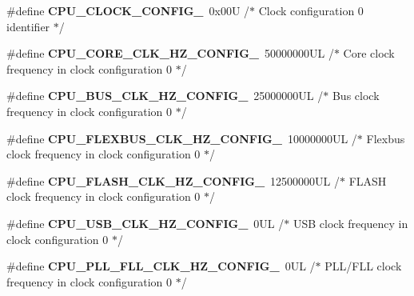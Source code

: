 \begin{DoxyCompactItemize}
\item 
\hypertarget{group___cpu__module_ga4d7ade6a1c335a7e5233938aa9197157}{}\#define {\bfseries C\+P\+U\+\_\+\+C\+L\+O\+C\+K\+\_\+\+C\+O\+N\+F\+I\+G\+\_}~0x00\+U /$\ast$ Clock configuration 0 identifier $\ast$/\label{group___cpu__module_ga4d7ade6a1c335a7e5233938aa9197157}

\item 
\hypertarget{group___cpu__module_ga6fe0b841d40421ee48af4a4e01e48ddf}{}\#define {\bfseries C\+P\+U\+\_\+\+C\+O\+R\+E\+\_\+\+C\+L\+K\+\_\+\+H\+Z\+\_\+\+C\+O\+N\+F\+I\+G\+\_}~50000000\+U\+L /$\ast$ Core clock frequency in clock configuration 0 $\ast$/\label{group___cpu__module_ga6fe0b841d40421ee48af4a4e01e48ddf}

\item 
\hypertarget{group___cpu__module_gaf060a047649b9537eb77354ab7917a8b}{}\#define {\bfseries C\+P\+U\+\_\+\+B\+U\+S\+\_\+\+C\+L\+K\+\_\+\+H\+Z\+\_\+\+C\+O\+N\+F\+I\+G\+\_}~25000000\+U\+L /$\ast$ Bus clock frequency in clock configuration 0 $\ast$/\label{group___cpu__module_gaf060a047649b9537eb77354ab7917a8b}

\item 
\hypertarget{group___cpu__module_ga706c0d4dd14c93181b7a99badddc9a51}{}\#define {\bfseries C\+P\+U\+\_\+\+F\+L\+E\+X\+B\+U\+S\+\_\+\+C\+L\+K\+\_\+\+H\+Z\+\_\+\+C\+O\+N\+F\+I\+G\+\_}~10000000\+U\+L /$\ast$ Flexbus clock frequency in clock configuration 0 $\ast$/\label{group___cpu__module_ga706c0d4dd14c93181b7a99badddc9a51}

\item 
\hypertarget{group___cpu__module_ga09c9820f38d931a0400b832d2582c6f7}{}\#define {\bfseries C\+P\+U\+\_\+\+F\+L\+A\+S\+H\+\_\+\+C\+L\+K\+\_\+\+H\+Z\+\_\+\+C\+O\+N\+F\+I\+G\+\_}~12500000\+U\+L /$\ast$ F\+L\+A\+S\+H clock frequency in clock configuration 0 $\ast$/\label{group___cpu__module_ga09c9820f38d931a0400b832d2582c6f7}

\item 
\hypertarget{group___cpu__module_ga7bf843fdf59af5fcaf48bea898884a3e}{}\#define {\bfseries C\+P\+U\+\_\+\+U\+S\+B\+\_\+\+C\+L\+K\+\_\+\+H\+Z\+\_\+\+C\+O\+N\+F\+I\+G\+\_}~0\+U\+L /$\ast$ U\+S\+B clock frequency in clock configuration 0 $\ast$/\label{group___cpu__module_ga7bf843fdf59af5fcaf48bea898884a3e}

\item 
\hypertarget{group___cpu__module_gad2aaa2918b640ae3833fc84e8f983c3c}{}\#define {\bfseries C\+P\+U\+\_\+\+P\+L\+L\+\_\+\+F\+L\+L\+\_\+\+C\+L\+K\+\_\+\+H\+Z\+\_\+\+C\+O\+N\+F\+I\+G\+\_}~0\+U\+L /$\ast$ P\+L\+L/\+F\+L\+L clock frequency in clock configuration 0 $\ast$/\label{group___cpu__module_gad2aaa2918b640ae3833fc84e8f983c3c}


\end{DoxyCompactItemize}

